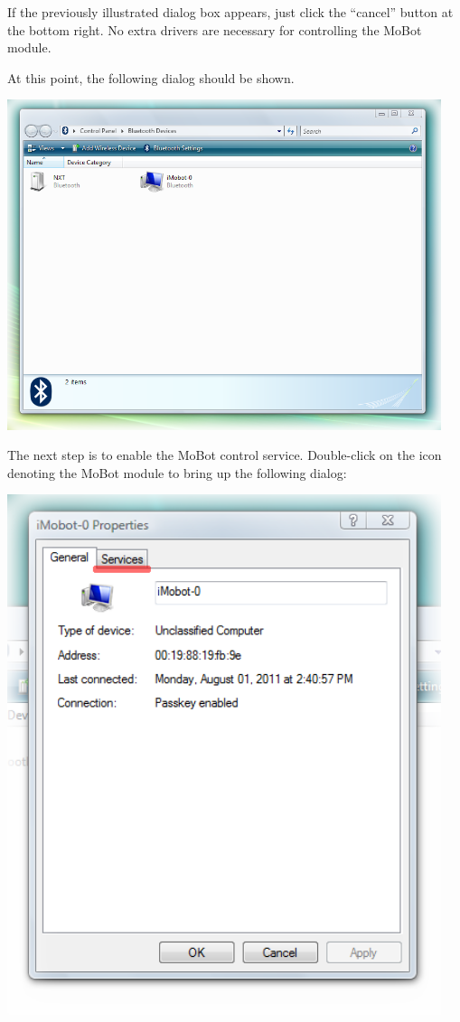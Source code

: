 \documentclass{article}
\begin{document}
If the previously illustrated dialog box appears, just click the ``cancel''
button at the bottom right. No extra drivers are necessary for controlling the
MoBot module.

At this point, the following dialog should be shown.

\begin{center}
\includegraphics[width=5in]{images/imobot_connect_6.png}
\end{center}

The next step is to enable the MoBot control service. 
Double-click on the icon denoting the
MoBot module to bring up the following dialog:

\begin{center}
\includegraphics[width=5in]{images/imobot_connect_7.png}
\end{center}
\end{document}

